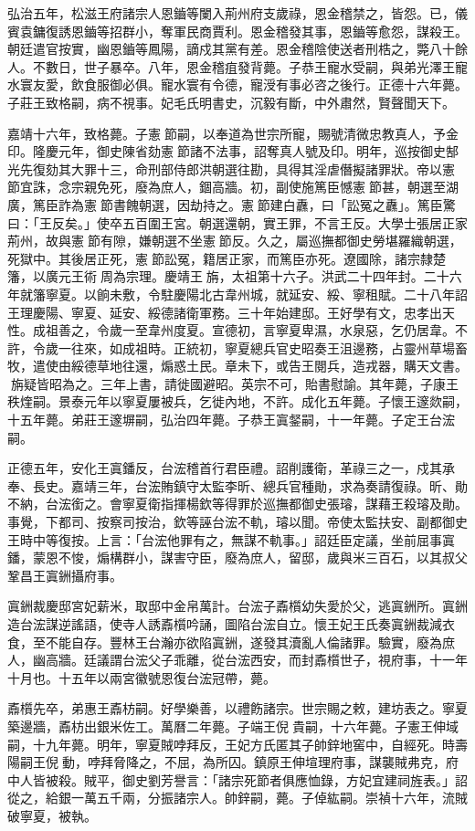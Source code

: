 弘治五年，松滋王府諸宗人恩鑡等闌入荊州府支歲祿，恩金稽禁之，皆怨。已，儀賓袁鏞復誘恩鑡等招群小，奪軍民商賈利。恩金稽發其事，恩鑡等愈怨，謀殺王。朝廷遣官按實，幽恩鑡等鳳陽，謫戍其黨有差。恩金稽陰使送者刑梏之，斃八十餘人。不數日，世子暴卒。八年，恩金稽疽發背薨。子恭王寵水受嗣，與弟光澤王寵水寰友愛，飲食服御必俱。寵水寰有令德，寵涭有事必咨之後行。正德十六年薨。子莊王致格嗣，病不視事。妃毛氏明書史，沉毅有斷，中外肅然，賢聲聞天下。

嘉靖十六年，致格薨。子憲節嗣，以奉道為世宗所寵，賜號清微忠教真人，予金印。隆慶元年，御史陳省劾憲節諸不法事，詔奪真人號及印。明年，巡按御史郜光先復劾其大罪十三，命刑部侍郎洪朝選往勘，具得其淫虐僭擬諸罪狀。帝以憲節宜誅，念宗親免死，廢為庶人，錮高牆。初，副使施篤臣憾憲節甚，朝選至湖廣，篤臣詐為憲節書餽朝選，因劫持之。憲節建白纛，曰「訟冤之纛」。篤臣驚曰：「王反矣。」使卒五百圍王宮。朝選還朝，實王罪，不言王反。大學士張居正家荊州，故與憲節有隙，嫌朝選不坐憲節反。久之，屬巡撫都御史勞堪羅織朝選，死獄中。其後居正死，憲節訟冤，籍居正家，而篤臣亦死。遼國除，諸宗隸楚籓，以廣元王術周為宗理。慶靖王旃，太祖第十六子。洪武二十四年封。二十六年就籓寧夏。以餉未敷，令駐慶陽北古韋州城，就延安、綏、寧租賦。二十八年詔王理慶陽、寧夏、延安、綏德諸衛軍務。三十年始建邸。王好學有文，忠孝出天性。成祖善之，令歲一至韋州度夏。宣德初，言寧夏卑濕，水泉惡，乞仍居韋。不許，令歲一往來，如成祖時。正統初，寧夏總兵官史昭奏王沮邊務，占靈州草場畜牧，遣使由綏德草地往還，煽惑土民。章未下，或告王閱兵，造戎器，購天文書。旃疑皆昭為之。三年上書，請徙國避昭。英宗不可，貽書慰諭。其年薨，子康王秩煃嗣。景泰元年以寧夏屢被兵，乞徙內地，不許。成化五年薨。子懷王邃欻嗣，十五年薨。弟莊王邃塀嗣，弘治四年薨。子恭王寘錖嗣，十一年薨。子定王台浤嗣。

正德五年，安化王寘鐇反，台浤稽首行君臣禮。詔削護衛，革祿三之一，戍其承奉、長史。嘉靖三年，台浤賄鎮守太監李昕、總兵官種勛，求為奏請復祿。昕、勛不納，台浤銜之。會寧夏衛指揮楊欽等得罪於巡撫都御史張璿，謀藉王殺璿及勛。事覺，下都司、按察司按治，欽等誣台浤不軌，璿以聞。帝使太監扶安、副都御史王時中等復按。上言：「台浤他罪有之，無謀不軌事。」詔廷臣定議，坐前屈事寘鐇，蒙恩不悛，煽構群小，謀害守臣，廢為庶人，留邸，歲與米三百石，以其叔父鞏昌王寘銂攝府事。

寘銂裁慶邸宮妃薪米，取邸中金帛萬計。台浤子鼒櫍幼失愛於父，逃寘銂所。寘銂造台浤謀逆謠語，使寺人誘鼒櫍吟誦，圖陷台浤自立。懷王妃王氏奏寘銂裁減衣食，至不能自存。豐林王台瀚亦欲陷寘銂，遂發其瀆亂人倫諸罪。驗實，廢為庶人，幽高牆。廷議謂台浤父子乖離，從台浤西安，而封鼒櫍世子，視府事，十一年十月也。十五年以兩宮徽號恩復台浤冠帶，薨。

鼒櫍先卒，弟惠王鼒枋嗣。好學樂善，以禮飭諸宗。世宗賜之敕，建坊表之。寧夏築邊牆，鼒枋出銀米佐工。萬曆二年薨。子端王倪貴嗣，十六年薨。子憲王伸域嗣，十九年薨。明年，寧夏賊哱拜反，王妃方氏匿其子帥鋅地窖中，自經死。時壽陽嗣王倪動，哱拜脅降之，不屈，為所囚。鎮原王伸塇理府事，謀襲賊弗克，府中人皆被殺。賊平，御史劉芳譽言：「諸宗死節者俱應恤錄，方妃宜建祠旌表。」詔從之，給銀一萬五千兩，分振諸宗人。帥鋅嗣，薨。子倬紘嗣。崇禎十六年，流賊破寧夏，被執。


